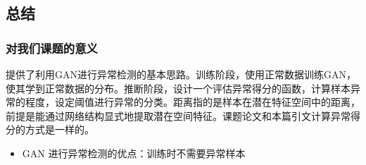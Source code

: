 \documentclass[12pt]{article}
\begin{document}
\subsection{\textbf{总结}\label{header-n58}}

\subsubsection{对我们课题的意义}\label{header-n85}

提供了利用GAN进行异常检测的基本思路。训练阶段，使用正常数据训练GAN，使其学到正常数据的分布。推断阶段，设计一个评估异常得分的函数，计算样本异常的程度，设定阈值进行异常的分类。距离指的是样本在潜在特征空间中的距离，前提是能通过网络结构显式地提取潜在空间特征。课题论文和本篇引文计算异常得分的方式是一样的。

\begin{itemize}
\item
  GAN 进行异常检测的优点：训练时不需要异常样本
\end{itemize}
\end{document}

